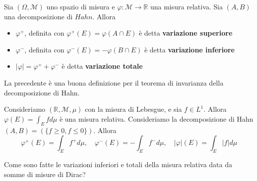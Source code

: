 \begin{definition}
    Sia \((\Omega, \mathcal{M})\) uno spazio di misura e \(\varphi : \mathcal{M}
    \to \mathbb{R}\) una misura relativa. Sia \((A, B)\) una decomposizione di
    \(Hahn\). Allora
\begin{itemize}[label = --]
    \item \(\varphi^{+}\), definita con \(\varphi^{+}(E) = \varphi(A \cap E)\) è
        detta \textbf{variazione superiore}
    \item \(\varphi^{-}\), definita con \(\varphi^{-}(E) = -\varphi(B \cap E)\)
        è detta \textbf{variazione inferiore}
    \item \(|\varphi| = \varphi^{+} + \varphi^{-}\) è detta \textbf{variazione totale}
\end{itemize}
\end{definition}
\begin{remark}
    La precedente è una buona definizione per il teorema di invarianza della
    decomposizione di Hahn.
\end{remark}
\begin{example}
    Consideriamo \((\mathbb{R}, \mathcal{M}, \mu)\) con la misura di Lebesgue, e
    sia \(f \in L^{1}\). Allora \(\varphi(E) = \int_E f d\mu\) è una misura
    relativa. Consideriamo la decomposizione di Hahn \((A, B) = (\{ f \ge 0, f
    \le 0\})\). Allora
    \[
        \varphi^{+}(E) = \int_{E} f^{+} d\mu, \quad 
        \varphi^{-}(E) = -\int_{E} f^{-} d\mu, \quad 
        |\varphi|(E) = \int_{E} |f| d\mu
    \]
\end{example}
\begin{eser}
    Come sono fatte le variazioni inferiori e totali della misura relativa data
    da somme di misure di Dirac?
\end{eser}


